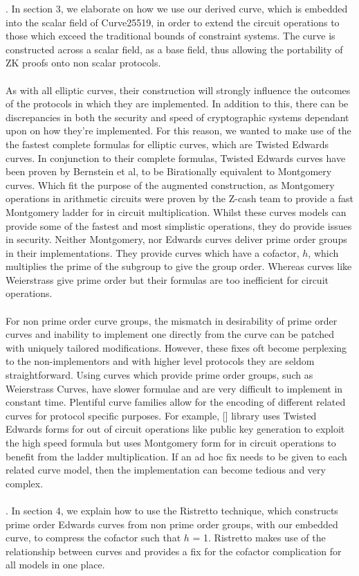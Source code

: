 \documentclass{article}
\begin{document}
  .
In section 3, we elaborate on how we use our derived curve, which is embedded into the scalar field of Curve25519, in order to extend the circuit operations to those which exceed the traditional bounds of constraint systems. The curve is constructed across a scalar field, as a base field, thus allowing the portability of ZK proofs onto non scalar protocols.\\\\
As with all elliptic curves, their construction will strongly influence the outcomes of the protocols in which they are implemented. In addition to this, there can be discrepancies in both the security and speed of cryptographic systems dependant upon on how they're implemented. For this reason, we wanted to make use of the the fastest complete formulas for elliptic curves, which are Twisted Edwards curves. In conjunction to their complete formulas, Twisted Edwards curves have been proven by Bernstein et al, to be Birationally equivalent to Montgomery curves. Which fit the purpose of the augmented construction, as Montgomery operations in arithmetic circuits were proven by the Z-cash team to provide a fast Montgomery ladder for in circuit multiplication. Whilst these curves models can provide some of the fastest and most simplistic operations, they do provide issues in security. Neither Montgomery, nor Edwards curves deliver prime order groups in their implementations. They provide curves which have a cofactor, $h$, which multiplies the prime of the subgroup to give the group order. Whereas curves like Weierstrass give prime order but their formulas are too inefficient for circuit operations.\\\\ 
For non prime order curve groups, the mismatch in desirability of prime order curves and inability to implement one directly from the curve can be patched with uniquely tailored modifications.  However, these fixes oft become perplexing to the non-implementors and with higher level protocols they are seldom straightforward. Using curves which provide prime order groups, such as Weierstrass Curves, have slower formulae and are very difficult to implement in constant time. Plentiful curve families allow for the encoding of different related curves for protocol specific purposes. For example, [] library uses Twisted Edwards forms for out of circuit operations like public key generation to exploit the high speed formula but uses Montgomery form for in circuit operations to benefit from the ladder multiplication. If an ad hoc fix needs to be given to each related curve model, then the implementation can become tedious and very complex.\\\\
  .
In section 4, we explain how to use the Ristretto technique, which constructs prime order Edwards curves from non prime order groups, with our embedded curve, to compress the cofactor such that $h$ = 1. Ristretto makes use of the relationship between curves and provides a fix for the cofactor complication for all models in one place.\\\\
\end{document}
